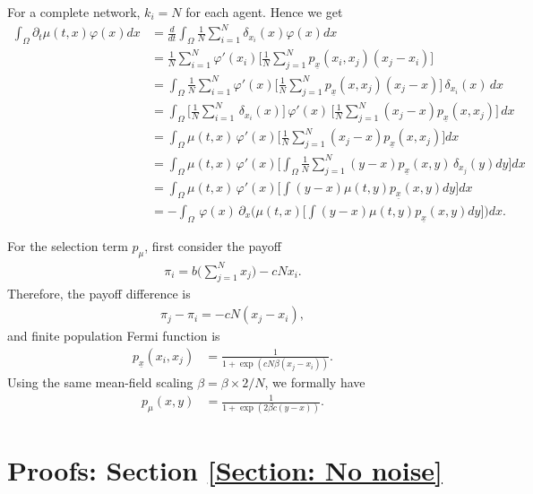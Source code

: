\documentclass[10pt]{article}
\begin{document}
For a complete network, $k_i=N$ for each agent. Hence we get
\begin{align*}
    \int_\Omega \partial_t\mu(t,x)\varphi(x)dx &= \frac{d}{dt}\int_\Omega\frac{1}{N}\sum_{i=1}^N \delta_{x_i}(x) \varphi(x)dx\\
    &=\frac{1}{N} \sum_{i=1}^N \varphi'(x_i) \Bigg[\frac{1}{N}\sum_{j=1}^N p_{\underline{x}}(x_i,x_j)(x_j-x_i)\Bigg]\\
    &=\int_\Omega\frac{1}{N} \sum_{i=1}^N \varphi'(x) \Bigg[\frac{1}{N}\sum_{j=1}^N p_{\underline{x}}(x,x_j)(x_j-x) \Bigg] \,\delta_{x_i}(x) \, dx\\
    &=\int_\Omega \Bigg[ \frac{1}{N} \sum_{i=1}^N \,\delta_{x_i}(x) \Bigg] \, \varphi'(x) \,\Bigg[\frac{1}{N}\sum_{j=1}^N (x_j-x)p_{\underline{x}}(x,x_j) \Bigg] \, dx\\
    &=\int_\Omega\mu(t,x) \,\varphi'(x) \Bigg[\frac{1}{N}\sum_{j=1}^N (x_j-x)p_{\underline{x}}(x,x_j)\Bigg] dx\\
    &=\int_\Omega\mu(t,x) \,\varphi'(x) \Bigg[\int_\Omega \frac{1}{N}\sum_{j=1}^N (y-x)p_{\underline{x}}(x,y)\,\delta_{x_j}(y)dy\Bigg] dx\\
    &=\int_\Omega\mu(t,x) \,\varphi'(x) \Bigg[\int(y-x)\mu(t,y)p_{\underline{x}}(x,y)dy\Bigg] dx\\
    &=-\int_\Omega \,\varphi(x) \, \partial_x \Bigg( \mu(t,x)\Bigg[ \int(y-x)\mu(t,y)p_{\underline{x}}(x,y)dy\Bigg] \Bigg) dx.
\end{align*}

For the selection term $p_\mu$, first consider the payoff
\begin{align*}
    \pi_i = b\bigg(\sum_{j=1}^N x_j \bigg) - cN x_i.
\end{align*}
Therefore, the payoff difference is
\begin{align*}
    \pi_j-\pi_i =  -cN(x_j-x_i),
\end{align*}
and finite population Fermi function is
\begin{align*}
    p_{\underline{x}}(x_i,x_j) &= \frac{1}{1+\exp(cN\beta(x_j-x_i))}.
\end{align*}
Using the same mean-field scaling $\beta= \beta \times 2/N$, we formally have
\begin{align*}
    p_{\mu}(x,y) &= \frac{1}{1+\exp(2\beta c(y-x))}.
\end{align*}

\section{Proofs: Section \ref{Section: No noise}} \label{Appendix: No noise}
\end{document}

